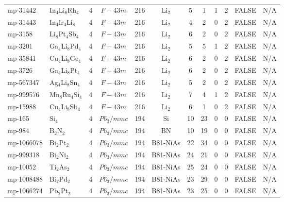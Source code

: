 {\begin{longtable}{llcccccccccc}
    mp-31442 & In$_{4}$Li$_{8}$Rh$_{4}$ & 4     & $F-43m$ & 216   & Li$_{2}$ & 5     & 1     & 1     & 2     & FALSE & N/A \\
    mp-31443 & In$_{4}$Ir$_{4}$Li$_{8}$ & 4     & $F-43m$ & 216   & Li$_{2}$ & 4     & 2     & 0     & 2     & FALSE & N/A \\
    mp-3158 & Li$_{8}$Pt$_{4}$Sb$_{4}$ & 4     & $F-43m$ & 216   & Li$_{2}$ & 6     & 2     & 0     & 2     & FALSE & N/A \\
    mp-3201 & Ga$_{4}$Li$_{8}$Pd$_{4}$ & 4     & $F-43m$ & 216   & Li$_{2}$ & 5     & 5     & 1     & 2     & FALSE & N/A \\
    mp-35841 & Cu$_{4}$Li$_{8}$Ge$_{4}$ & 4     & $F-43m$ & 216   & Li$_{2}$ & 6     & 2     & 0     & 2     & FALSE & N/A \\
    mp-3726 & Ga$_{4}$Li$_{8}$Pt$_{4}$ & 4     & $F-43m$ & 216   & Li$_{2}$ & 6     & 2     & 0     & 2     & FALSE & N/A \\
    mp-567347 & Ag$_{4}$Li$_{8}$Sn$_{4}$ & 4     & $F-43m$ & 216   & Li$_{2}$ & 5     & 2     & 0     & 2     & FALSE & N/A \\
    mp-999576 & Mn$_{8}$Ru$_{4}$Si$_{4}$ & 4     & $F-43m$ & 216   & Li$_{2}$ & 7     & 4     & 1     & 2     & FALSE & N/A \\
    mp-15988 & Cu$_{4}$Li$_{8}$Sb$_{4}$ & 4     & $F-43m$ & 216   & Li$_{2}$ & 6     & 1     & 0     & 2     & FALSE & N/A \\
    mp-165 & Si$_{4}$ & 4     & $P6_3/mmc$ & 194   & Si    & 10    & 23    & 0     & 0     & FALSE & N/A \\
    mp-984 & B$_{2}$N$_{2}$ & 4     & $P6_3/mmc$ & 194   & BN    & 10    & 19    & 0     & 0     & FALSE & N/A \\
    mp-1066078 & Bi$_{2}$Pt$_{2}$ & 4     & $P6_3/mmc$ & 194   & B81-NiAs & 22    & 34    & 0     & 0     & FALSE & N/A \\
    mp-999318 & Bi$_{2}$Ni$_{2}$ & 4     & $P6_3/mmc$ & 194   & B81-NiAs & 24    & 21    & 0     & 0     & FALSE & N/A \\
    mp-10052 & Ti$_{2}$As$_{2}$ & 4     & $P6_3/mmc$ & 194   & B81-NiAs & 25    & 24    & 0     & 0     & FALSE & N/A \\
    mp-1008488 & Bi$_{2}$Pd$_{2}$ & 4     & $P6_3/mmc$ & 194   & B81-NiAs & 23    & 29    & 0     & 0     & FALSE & N/A \\
    mp-1066274 & Pb$_{2}$Pt$_{2}$ & 4     & $P6_3/mmc$ & 194   & B81-NiAs & 23    & 25    & 0     & 0     & FALSE & N/A \\

\end{longtable}}
